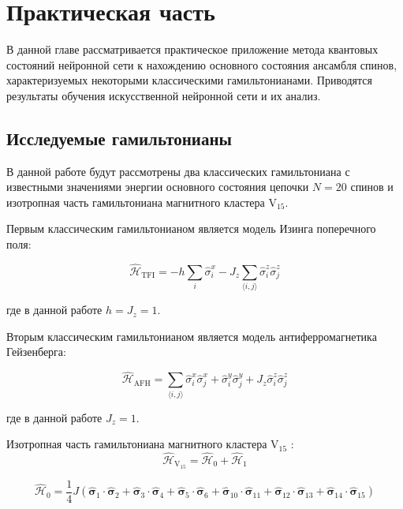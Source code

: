 \chapter{Практическая часть}

В данной главе рассматривается  практическое приложение метода квантовых состояний нейронной сети к 
нахождению основного состояния ансамбля спинов, характеризуемых некоторыми классическими гамильтонианами.
Приводятся результаты обучения искусственной нейронной сети и их анализ.

\section{Исследуемые гамильтонианы}

В данной работе будут рассмотрены два классических гамильтониана с известными значениями энергии основного состояния цепочки $N=20$ спинов и изотропная часть гамильтониана магнитного кластера $\text{V}_{15}$.

Первым классическим гамильтонианом является модель Изинга поперечного поля:

\begin{equation}
\hat{\mathcal{H}}_\text{TFI}=-h\sum_{i}\hat{\sigma}_i^x-J_z\sum_{\langle i,j\rangle}\hat{\sigma}_i^z \hat{\sigma}_j^z
\end{equation}

\noindent где в данной работе $h=J_z=1$.

Вторым классическим гамильтонианом является модель антиферромагнетика Гейзенберга:

\begin{equation}
\hat{\mathcal{H}}_\text{AFH}=\sum_{\langle i,j\rangle}\hat{\sigma}_i^x \hat{\sigma}_j^x+\hat{\sigma}_i^y \hat{\sigma}_j^y+J_z\hat{\sigma}_i^z \hat{\sigma}_j^z
\end{equation}

\noindent где в данной работе $J_z=1$.

Изотропная часть гамильтониана магнитного кластера $\text{V}_{15}$ \cite{konstantinidis2002magnetic}:
\begin{equation}
\hat{\mathcal{H}}_\text{V$_{15}$}=\hat{\mathcal{H}}_0+\hat{\mathcal{H}}_1
\end{equation}

\begin{equation*}
\hat{\mathcal{H}}_0=\frac{1}{4}J(\hat{\boldsymbol{\sigma}}_1 \cdot \hat{\boldsymbol{\sigma}}_2 + \hat{\boldsymbol{\sigma}}_3 \cdot \hat{\boldsymbol{\sigma}}_4 + \hat{\boldsymbol{\sigma}}_5 \cdot \hat{\boldsymbol{\sigma}}_6 + \hat{\boldsymbol{\sigma}}_{10} \cdot \hat{\boldsymbol{\sigma}}_{11} + \hat{\boldsymbol{\sigma}}_{12} \cdot \hat{\boldsymbol{\sigma}}_{13} + \hat{\boldsymbol{\sigma}}_{14} \cdot \hat{\boldsymbol{\sigma}}_{15})
\end{equation*}

